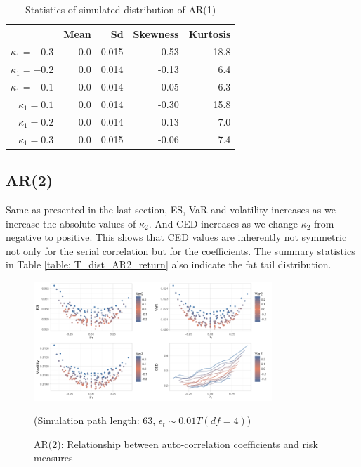\documentclass[11pt]{article}
\begin{document}
\begin{table}[H]
\centering
\begin{tabular}{|r |r r r r|}
\hline
& Mean & Sd & Skewness & Kurtosis \\
\hline
$\kappa_1 = -0.3$ & 0.0 & 0.015 & -0.53 & 18.8\\
$\kappa_1 = -0.2$ & 0.0 & 0.014 & -0.13 & 6.4\\
$\kappa_1 = -0.1$ & 0.0 & 0.014 & -0.05 & 6.3\\
$\kappa_1 = 0.1$ & 0.0 & 0.014 & -0.30 & 15.8\\
$\kappa_1 = 0.2$ & 0.0 & 0.014 & 0.13 & 7.0\\
$\kappa_1 = 0.3$ & 0.0 & 0.015 & -0.06 & 7.4\\
\hline
\end{tabular}
\caption{Statistics of simulated distribution of AR(1)}
\label{table: T_dist_AR1_return}
\end{table}

\subsection{AR(2)}

Same as presented in the last section, ES, VaR and volatility increases as we increase the absolute values of $\kappa_2$. And CED increases as we change $\kappa_2$ from negative to positive. This shows that CED values are inherently not symmetric not only for the serial correlation but for the coefficients. The summary statistics in Table \ref{table: T_dist_AR2_return} also indicate the fat tail distribution.

\begin{figure}[H]
\centering
\includegraphics[width = 0.8\textwidth]{../figures/simulation/T_dist_AR2_risk_measures}
\caption{AR(2): Relationship between auto-correlation coefficients and risk measures}
(Simulation path length: 63, $\epsilon_t \sim 0.01T(df = 4)$)
\label{fig:T_dist_AR2_risk_measures}
\end{figure}
\end{document}
